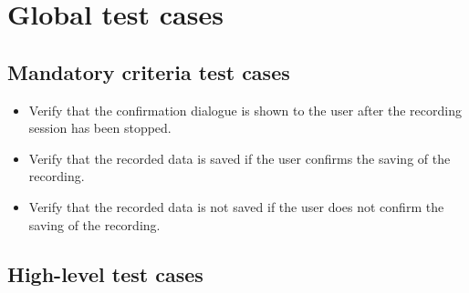 \chapter{Global test cases}
\label{ch:tests}

\newcommand{\testfor}[2]{\addtocounter{counterTC}{10}\item[TC\arabic{counterTC}\label{TC\arabic{counterTC}}\\\begin{footnotesize}\textit{(tests \specref{#1})}\end{footnotesize}]{#2}}
\newcommand{\test}{\addtocounter{counterTC}{10}\item[TC\arabic{counterTC}\label{TC\arabic{counterTC}}]}
\newenvironment{tests}{\begin{itemize}[font = \normalfont, style = multiline, labelwidth = 60pt, leftmargin = !]}{\end{itemize}}

\section{Mandatory criteria test cases}

\begin{tests}
    \testfor{MC50}{Verify that the confirmation dialogue is shown to the \gls{user} after the recording \gls{session} has been stopped.}
    \testfor{MC50}{Verify that the recorded data is saved if the \gls{user} confirms the saving of the recording.}
    \testfor{MC50}{Verify that the recorded data is not saved if the \gls{user} does not confirm the saving of the recording.}
\end{tests}

\section{High-level test cases}


